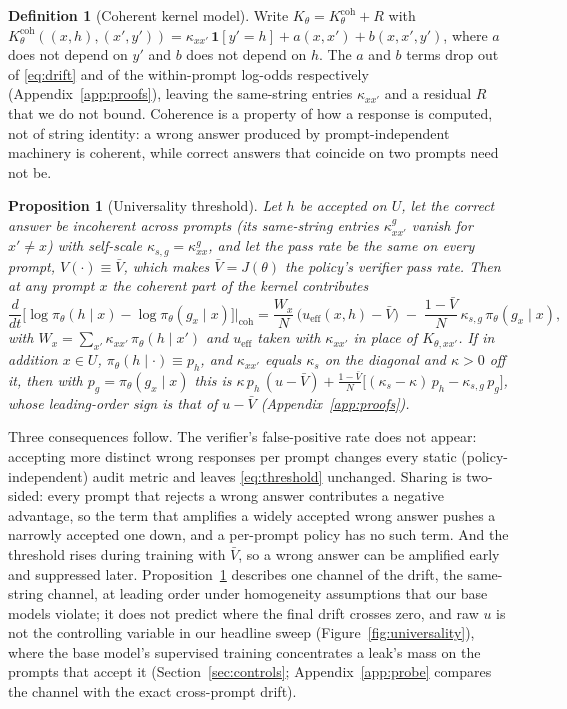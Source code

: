 \documentclass{article}
\newtheorem{proposition}{Proposition}
\theoremstyle{definition}
\newtheorem{definition}{Definition}
\newcommand{\Kk}{K_\theta}
\newcommand{\Kcoh}{K_\theta^{\mathrm{coh}}}
\newcommand{\Kxx}{K_{\theta,xx'}}
\newcommand{\pth}{\pi_\theta}
\newcommand{\ueff}{u_{\mathrm{eff}}}
\begin{document}
\begin{definition}[Coherent kernel model]
\label{def:coherent}
Write $\Kk = \Kcoh + R$ with $\Kcoh((x,h),(x',y')) = \kappa_{xx'}\,\mathbf{1}[y'=h] + a(x,x') + b(x,x',y')$, where $a$ does not depend on $y'$ and $b$ does not depend on $h$. The $a$ and $b$ terms drop out of \eqref{eq:drift} and of the within-prompt log-odds respectively (Appendix~\ref{app:proofs}), leaving the same-string entries $\kappa_{xx'}$ and a residual $R$ that we do not bound. Coherence is a property of how a response is computed, not of string identity: a wrong answer produced by prompt-independent machinery is coherent, while correct answers that coincide on two prompts need not be.
\end{definition}

\begin{proposition}[Universality threshold]
\label{prop:threshold}
Let $h$ be accepted on $U$, let the correct answer be incoherent across prompts (its same-string entries $\kappa^{g}_{xx'}$ vanish for $x'\neq x$) with self-scale $\kappa_{s,g}=\kappa^{g}_{xx}$, and let the pass rate be the same on every prompt, $V(\cdot)\equiv\bar V$, which makes $\bar V=J(\theta)$ the policy's verifier pass rate. Then at any prompt $x$ the coherent part of the kernel contributes
\begin{equation}
\frac{d}{dt}\Big[\log\pth(h\mid x) - \log\pth(g_x\mid x)\Big]\Big|_{\mathrm{coh}}
= \frac{W_x}{N}\,\big(\ueff(x,h)-\bar V\big) \;-\; \frac{1-\bar V}{N}\,\kappa_{s,g}\,\pth(g_x\mid x),
\label{eq:threshold}
\end{equation}
with $W_x=\sum_{x'}\kappa_{xx'}\,\pth(h\mid x')$ and $\ueff$ taken with $\kappa_{xx'}$ in place of $\Kxx$. If in addition $x\in U$, $\pth(h\mid\cdot)\equiv p_h$, and $\kappa_{xx'}$ equals $\kappa_s$ on the diagonal and $\kappa>0$ off it, then with $p_g=\pth(g_x\mid x)$ this is $\kappa\,p_h\,(u-\bar V) + \frac{1-\bar V}{N}\big[(\kappa_s-\kappa)\,p_h - \kappa_{s,g}\,p_g\big]$, whose leading-order sign is that of $u-\bar V$ (Appendix~\ref{app:proofs}).
\end{proposition}

Three consequences follow. The verifier's false-positive rate does not appear: accepting more distinct wrong responses per prompt changes every static (policy-independent) audit metric and leaves \eqref{eq:threshold} unchanged. Sharing is two-sided: every prompt that rejects a wrong answer contributes a negative advantage, so the term that amplifies a widely accepted wrong answer pushes a narrowly accepted one down, and a per-prompt policy has no such term. And the threshold rises during training with $\bar V$, so a wrong answer can be amplified early and suppressed later. Proposition~\ref{prop:threshold} describes one channel of the drift, the same-string channel, at leading order under homogeneity assumptions that our base models violate; it does not predict where the final drift crosses zero, and raw $u$ is not the controlling variable in our headline sweep (Figure~\ref{fig:universality}), where the base model's supervised training concentrates a leak's mass on the prompts that accept it (Section~\ref{sec:controls}; Appendix~\ref{app:probe} compares the channel with the exact cross-prompt drift).
\end{document}
